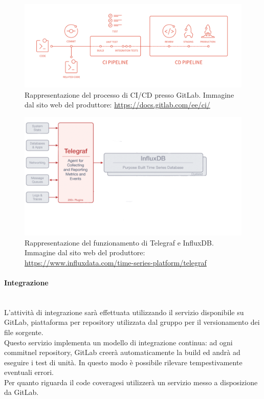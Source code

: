 \begin{figure}[H]
	\begin{center}
		\includegraphics[scale=0.18]{./images/cicd_pipeline_gitlab.png}
		\caption{Rappresentazione del processo di CI/CD presso GitLab. Immagine dal sito web del produttore: \url{https://docs.gitlab.com/ee/ci/}}
	\end{center}
\end{figure}

\begin{figure}[H]
	\begin{center}
		\includegraphics[scale=0.4]{./images/influxTelegraf.png}
		\caption{Rappresentazione del funzionamento di Telegraf e InfluxDB. Immagine dal sito web del produttore: \url{https://www.influxdata.com/time-series-platform/telegraf}}
	\end{center}
\end{figure}

\paragraph{Integrazione}\label{Progettazione_Integrazione}\-\\
L'attività di integrazione sarà effettuata utilizzando il servizio disponibile su GitLab, piattaforma per repository utilizzata dal gruppo per il versionamento dei file sorgente.\\
Questo servizio implementa un modello di integrazione continua: ad ogni commit\glossario nel repository\glossario, GitLab creerà automaticamente la build ed andrà ad eseguire i test di unità. In questo modo è possibile rilevare tempestivamente eventuali errori.\\
Per quanto riguarda il code coverage\glossario si utilizzerà un servizio messo a disposizione da GitLab.\\

